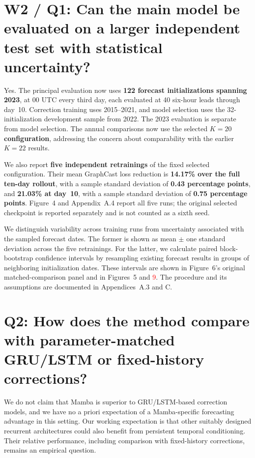 \documentclass[11pt]{article}
\begin{document}
\section*{W2 / Q1: Can the main model be evaluated on a larger independent test set with statistical uncertainty?}

Yes. The principal evaluation now uses \textbf{122 forecast initializations spanning 2023}, at 00 UTC every third day, each evaluated at 40 six-hour leads through day~10. Correction training uses 2015--2021, and model selection uses the 32-initialization development sample from 2022. The 2023 evaluation is separate from model selection. The annual comparisons now use the selected \textbf{$K=20$ configuration}, addressing the concern about comparability with the earlier $K=22$ results.

We also report \textbf{five independent retrainings} of the fixed selected configuration. Their mean GraphCast loss reduction is \textbf{14.17\% over the full ten-day rollout}, with a sample standard deviation of \textbf{0.43 percentage points}, and \textbf{21.03\% at day~10}, with a sample standard deviation of \textbf{0.75 percentage points}. Figure~4 and Appendix~A.4 report all five runs; the original selected checkpoint is reported separately and is not counted as a sixth seed.

We distinguish variability across training runs from uncertainty associated with the sampled forecast dates. The former is shown as mean $\pm$ one standard deviation across the five retrainings. For the latter, we calculate paired block-bootstrap confidence intervals by resampling existing forecast results in groups of neighboring initialization dates. These intervals are shown in Figure~6's original matched-comparison panel and in Figures~5 and \textcolor{red}{9}. The procedure and its assumptions are documented in Appendices~A.3 and C.

\section*{Q2: How does the method compare with parameter-matched GRU/LSTM or fixed-history corrections?}

We do not claim that Mamba is superior to GRU/LSTM-based correction models, and we have no a priori expectation of a Mamba-specific forecasting advantage in this setting. Our working expectation is that other suitably designed recurrent architectures could also benefit from persistent temporal conditioning. Their relative performance, including comparison with fixed-history corrections, remains an empirical question.
\end{document}
